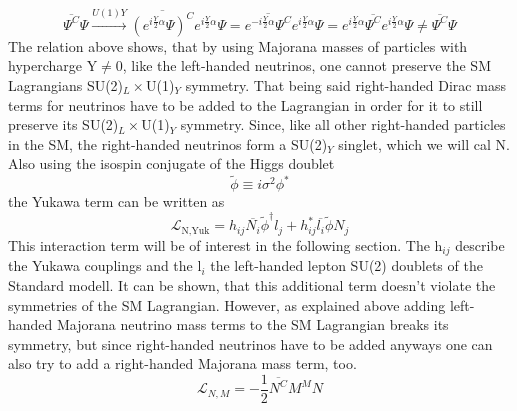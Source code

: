 \begin{equation*}
	\overline{\Psi^C}\Psi \overset{U(1)Y}{\longrightarrow}\overline{(e^{i\frac{Y}{2}\alpha}\Psi)^C}e^{i\frac{Y}{2}\alpha}\Psi=\overline{e^{-i\frac{Y}{2}\alpha}\Psi^C}e^{i\frac{Y}{2}\alpha}\Psi=e^{i\frac{Y}{2}\alpha}\overline{\Psi^C}e^{i\frac{Y}{2}\alpha}\Psi\neq	\overline{\Psi^C}\Psi
\end{equation*}
The relation above shows, that by using Majorana masses of particles with hypercharge Y$\neq$0, like the left-handed neutrinos, one cannot preserve the SM Lagrangians SU(2)$_L\times$U(1)$_Y$ symmetry. 
\newline
That being said right-handed Dirac mass terms for neutrinos have to be added to the Lagrangian in order for it to still preserve its SU(2)$_L\times$U(1)$_Y$ symmetry. Since, like all other right-handed particles in the SM, the right-handed neutrinos form a SU(2)$_Y$ singlet, which we will cal N. Also using the isospin conjugate of the Higgs doublet 
\begin{equation*}
	\tilde{\phi}\equiv i\sigma^2\phi^*
\end{equation*}
the Yukawa term can be written as
\begin{equation}
	\mathcal{L}_{\text{N,Yuk}}=h_{ij}\overline{N_i}\tilde{\phi}^\dagger l_j +h_{ij}^* \overline{l_i}\tilde{\phi} N_j
	\label{eq:Yukterm}
\end{equation}
This interaction term will be of interest in the following section. \newline
The h$_{ij}$ describe the Yukawa couplings and the l$_i$ the left-handed lepton SU(2) doublets of the Standard modell. It can be shown, that this additional term doesn't violate the symmetries of the SM Lagrangian. \newline
However, as explained above adding left-handed Majorana neutrino mass terms to the SM Lagrangian breaks its symmetry, but since right-handed neutrinos have to be added anyways one can also try to add a right-handed Majorana mass term, too.
\begin{equation}
\mathcal{L}_{N,M}=-\frac{1}{2}\overline{N^C}M^MN
\label{eq:neutrino_majorana}
\end{equation}
